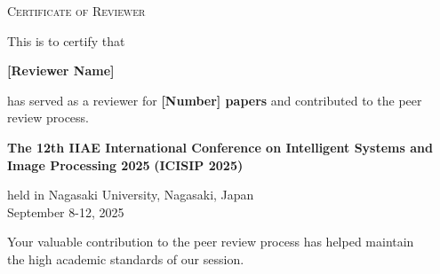 \documentclass[landscape]{article}
\begin{document}
\pagestyle{empty}


\vspace{2cm}
\begin{center}
    \vspace*{0.2cm}
    {\Huge \textsc{Certificate of Reviewer}}

    \vspace{0.8cm}
    {\LARGE This is to certify that}

    \vspace{0.4cm}
    {\Huge \textbf{[Reviewer Name]}}

    \vspace{0.4cm}
    {\large has served as a reviewer for \textbf{[Number] papers}}
    \vspace{0.5cm}
    {\large and contributed to the peer review process.}

    \vspace{0.5cm}
    {\large \textbf{The 12th IIAE International Conference on Intelligent Systems and Image Processing 2025}}
    {\large \textbf{(ICISIP 2025)}}

    \vspace{0.5cm}
    {\large held in Nagasaki University, Nagasaki, Japan\\
        September 8-12, 2025}

    \vspace{0.5cm}
    {\large Your valuable contribution to the peer review process has helped maintain\\
        the high academic standards of our session.}


\end{center}
\end{document}
